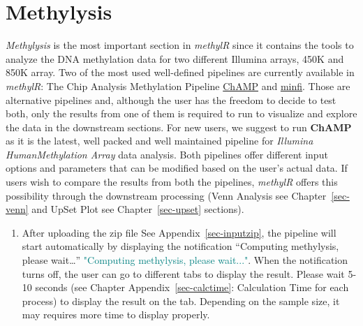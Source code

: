 \documentclass[
  a4paper,
  oneside,
  open=any]{scrreport}
\providecommand{\tightlist}{%
  \setlength{\itemsep}{0pt}\setlength{\parskip}{0pt}}\usepackage{longtable,booktabs,array}
\begin{document}
\hypertarget{sec-methylysis}{%
\chapter{Methylysis}\label{sec-methylysis}}

\emph{Methylysis} is the most important section in \emph{methylR} since
it contains the tools to analyze the DNA methylation data for two
different Illumina arrays, 450K and 850K array. Two of the most used
well-defined pipelines are currently available in \emph{methylR}: The
Chip Analysis Methylation Pipeline
\href{https://bioconductor.org/packages/release/bioc/vignettes/ChAMP/inst/doc/ChAMP.html}{ChAMP}
and
\href{https://bioconductor.org/packages/release/bioc/vignettes/minfi/inst/doc/minfi.html}{minfi}.
Those are alternative pipelines and, although the user has the freedom
to decide to test both, only the results from one of them is required to
run to visualize and explore the data in the downstream sections. For
new users, we suggest to run \textbf{ChAMP} as it is the latest, well
packed and well maintained pipeline for \emph{Illumina HumanMethylation
Array} data analysis. Both pipelines offer different input options and
parameters that can be modified based on the user's actual data. If
users wish to compare the results from both the pipelines,
\emph{methylR} offers this possibility through the downstream processing
(Venn Analysis see Chapter~\ref{sec-venn} and UpSet Plot see
Chapter~\ref{sec-upset} sections).

\begin{tcolorbox}[enhanced jigsaw, left=2mm, colback=white, breakable, leftrule=.75mm, coltitle=black, toprule=.15mm, rightrule=.15mm, colbacktitle=quarto-callout-tip-color!10!white, title=\textcolor{quarto-callout-tip-color}{\faLightbulb}\hspace{0.5em}{Tip}, opacitybacktitle=0.6, colframe=quarto-callout-tip-color-frame, bottomrule=.15mm, bottomtitle=1mm, toptitle=1mm, titlerule=0mm, opacityback=0, arc=.35mm]

\begin{enumerate}
\def\labelenumi{\arabic{enumi}.}
\tightlist
\item
  After uploading the zip file See Appendix~\ref{sec-inputzip}, the
  pipeline will start automatically by displaying the notification
  {``Computing methylysis, please wait\ldots{}''}
  \textcolor{teal}{"Computing methylysis, please wait..."}. When the
  notification turns off, the user can go to different tabs to display
  the result. Please wait 5-10 seconds (see Chapter
  Appendix~\ref{sec-calctime}: Calculation Time for each process) to
  display the result on the tab. Depending on the sample size, it may
  requires more time to display properly.
\end{enumerate}

\end{tcolorbox}
\end{document}
